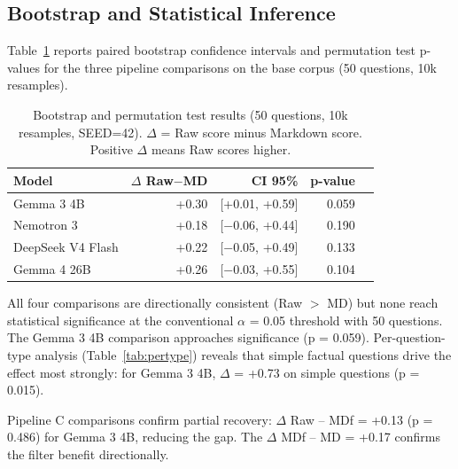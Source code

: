\documentclass{article}
\begin{document}
\subsection{Bootstrap and Statistical Inference}

Table~\ref{tab:bootstrap} reports paired bootstrap confidence intervals and permutation test p-values for the three pipeline comparisons on the base corpus (50 questions, 10k resamples).

\begin{table}[t]
    \centering
    \caption{Bootstrap and permutation test results (50 questions, 10k resamples, SEED=42). $\Delta$ = Raw score minus Markdown score. Positive $\Delta$ means Raw scores higher.}
    \label{tab:bootstrap}
    \begin{tabular}{lrrrr}
        \toprule
        Model & $\Delta$ Raw$-$MD & CI 95\% & p-value \\
        \midrule
        Gemma 3 4B          & +0.30 & [+0.01, +0.59] & 0.059 \\
        Nemotron 3          & +0.18 & [$-$0.06, +0.44] & 0.190 \\
        DeepSeek V4 Flash   & +0.22 & [$-$0.05, +0.49] & 0.133 \\
        Gemma 4 26B         & +0.26 & [$-$0.03, +0.55] & 0.104 \\
        \bottomrule
    \end{tabular}
\end{table}

All four comparisons are directionally consistent (Raw $>$ MD) but none reach statistical significance at the conventional $\alpha$ = 0.05 threshold with 50 questions. The Gemma 3 4B comparison approaches significance (p = 0.059). Per-question-type analysis (Table~\ref{tab:pertype}) reveals that simple factual questions drive the effect most strongly: for Gemma 3 4B, $\Delta$ = +0.73 on simple questions (p = 0.015).

Pipeline C comparisons confirm partial recovery: $\Delta$ Raw -- MDf = +0.13 (p = 0.486) for Gemma 3 4B, reducing the gap. The $\Delta$ MDf -- MD = +0.17 confirms the filter benefit directionally.
\end{document}
